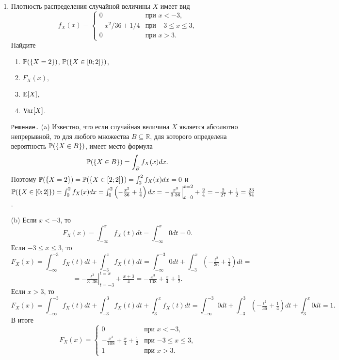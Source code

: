 \documentclass[12pt, a4paper]{article}\usepackage[]{graphicx}\usepackage[]{color}
\begin{document}
\begin{enumerate}
(e) $\Corr(X+Y, X-Y) = \frac{\Cov(X+Y, X-Y)}{\sqrt{\Var[X+Y]}\sqrt{\Var[X-Y]}} = \frac{-1}{\sqrt{1}\sqrt{5}} = -\frac{1}{\sqrt{5}}$. $\Box$
\item %
Плотность распределения случайной величины $X$ имеет вид
\[
f_X(x) =          \begin{cases}
                     0     &   \text{при $x < -3$,} \\
                     -x^{2}/36 + 1/4   &   \text{при $-3 \leq x \leq 3$,} \\
                     0     &   \text{при $x > 3$.}
                  \end{cases}
\]
Найдите
\begin{enumerate}
  \item $\P(\{X=2\})$, $\P(\{X \in [0;2]\})$,
  \item $F_X(x)$,
  \item $\E[X]$,
  \item $\Var[X]$.
\end{enumerate}

\verb"Решение." (a) Известно, что если случайная величина $X$ является абсолютно непрерывной, то для любого множества $B \subseteq \mathbb{R}$, для которого определена вероятность $\P(\{X \in B\})$, имеет место формула
\[
\P(\{X \in B\}) = \int_{B}f_X(x)dx.
\]
Поэтому $\P(\{X = 2\}) = \P(\{X \in [2;2]\}) = \int_{2}^{2}f_X(x)dx = 0$ и $\P(\{X \in [0;2]\}) = \int_{0}^{2}f_X(x)dx = \int_{0}^{2}\left(-\frac{x^2}{36} + \frac{1}{4}\right)dx = \left.-\frac{x^3}{3\cdot36}\right|_{x=0}^{x=2} + \frac{2}{4} = -\frac{2}{27} + \frac{1}{2} = \frac{23}{54}$.

(b) Если $x < -3$, то
\[
F_X(x) = \int_{-\infty}^{x}f_X(t)dt = \int_{-\infty}^{x}0dt = 0 \text{.}
\]
Если $-3 \leq x \leq 3$, то
\[
F_X(x) = \int_{-\infty}^{-3}f_X(t)dt + \int_{-3}^{x}f_X(t)dt= \int_{-\infty}^{-3}0dt + \int_{-3}^{x}\left(-\tfrac{t^2}{36} + \tfrac{1}{4}\right)dt =
\]
\[
= -\left.\tfrac{t^3}{3\cdot36}\right|_{t=-3}^{t=x} + \tfrac{x+3}{4} = -\tfrac{x^3}{108} + \tfrac{x}{4} + \tfrac{1}{2} \text{.}
\]
Если $x > 3$, то
\[
F_X(x) = \int_{-\infty}^{-3}f_X(t)dt + \int_{-3}^{3}f_X(t)dt + \int_{3}^{x}f_X(t)dt = \int_{-\infty}^{-3}0dt + \int_{-3}^{3}\left(-\tfrac{t^2}{36} + \tfrac{1}{4}\right)dt + \int_{3}^{x}0dt = 1 \text{.}
\]
В итоге
\[
F_X(x) =
                 \begin{cases}
                     0                   &   \text{при $x < -3$,} \\
                     -\tfrac{x^3}{108} + \tfrac{x}{4} + \tfrac{1}{2}   &   \text{при $-3 \leq x \leq 3$,} \\
                     1                   &   \text{при $x > 3$.}
                  \end{cases}
\]


\end{enumerate}
\end{document}
